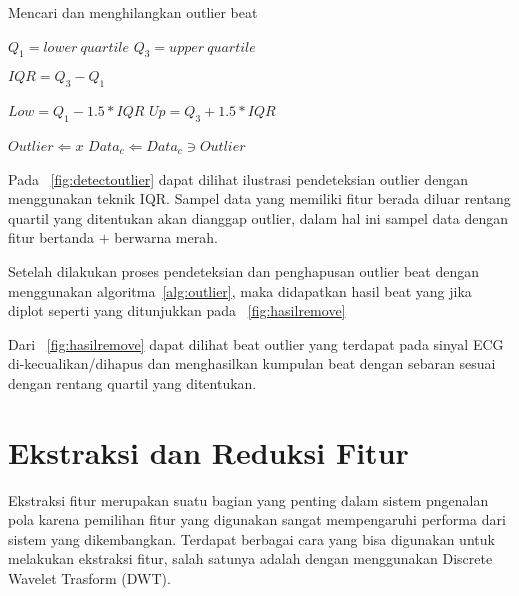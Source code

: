 \begin{algorithm}  
\caption{Mencari dan menghilangkan outlier beat}          
\label{alg:outlier}                           
\begin{algorithmic}                    %
			\STATE $Q_1 = lower\ quartile $  
			\STATE $Q_3 = upper\ quartile $ 
			
			\STATE
			\STATE $IQR = Q_3 - Q_1$ 
			
			\STATE
			\STATE {}
			\STATE $Low = Q_1 - 1.5 * IQR $ 
			\STATE $Up  = Q_3 + 1.5 * IQR $
			
			\STATE
			\STATE {}
				 	\STATE $Outlier \Leftarrow  x$ 
				\ENDIF
			\ENDFOR
		\ENDFOR
		\STATE $Data_c \Leftarrow Data_c \ni Outlier$
	\ENDFOR
\end{algorithmic}
\end{algorithm}

Pada \pic~\ref{fig:detectoutlier}  dapat dilihat ilustrasi pendeteksian outlier
dengan menggunakan teknik IQR. Sampel data yang memiliki fitur berada diluar
rentang quartil yang ditentukan akan dianggap outlier, dalam hal ini sampel data
dengan fitur bertanda $+$ berwarna merah.

Setelah dilakukan proses pendeteksian dan penghapusan outlier beat dengan
menggunakan algoritma~\ref{alg:outlier}, maka didapatkan hasil beat yang jika
diplot seperti yang ditunjukkan pada \pic~\ref{fig:hasilremove}


Dari \pic~\ref{fig:hasilremove} dapat dilihat beat outlier yang terdapat pada
sinyal ECG di-kecualikan/dihapus dan menghasilkan kumpulan beat dengan sebaran
sesuai dengan rentang quartil yang ditentukan.

\section{Ekstraksi dan Reduksi Fitur}
Ekstraksi fitur merupakan suatu bagian yang penting dalam sistem pngenalan pola
karena pemilihan fitur yang digunakan sangat mempengaruhi performa dari sistem
yang dikembangkan. Terdapat berbagai cara yang bisa digunakan untuk melakukan
ekstraksi fitur, salah satunya adalah dengan menggunakan Discrete Wavelet
Trasform (DWT).

